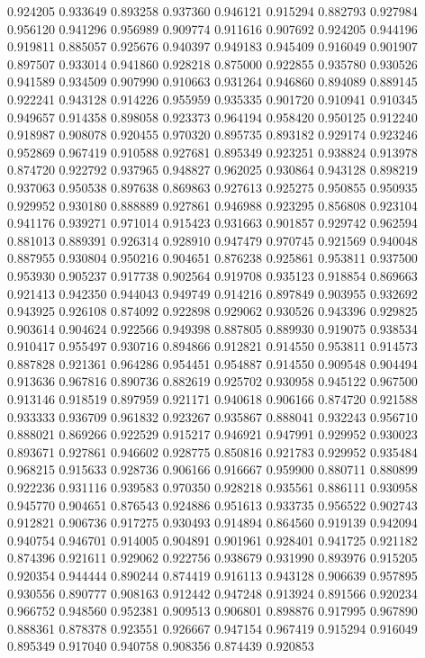 0.924205
0.933649
0.893258
0.937360
0.946121
0.915294
0.882793
0.927984
0.956120
0.941296
0.956989
0.909774
0.911616
0.907692
0.924205
0.944196
0.919811
0.885057
0.925676
0.940397
0.949183
0.945409
0.916049
0.901907
0.897507
0.933014
0.941860
0.928218
0.875000
0.922855
0.935780
0.930526
0.941589
0.934509
0.907990
0.910663
0.931264
0.946860
0.894089
0.889145
0.922241
0.943128
0.914226
0.955959
0.935335
0.901720
0.910941
0.910345
0.949657
0.914358
0.898058
0.923373
0.964194
0.958420
0.950125
0.912240
0.918987
0.908078
0.920455
0.970320
0.895735
0.893182
0.929174
0.923246
0.952869
0.967419
0.910588
0.927681
0.895349
0.923251
0.938824
0.913978
0.874720
0.922792
0.937965
0.948827
0.962025
0.930864
0.943128
0.898219
0.937063
0.950538
0.897638
0.869863
0.927613
0.925275
0.950855
0.950935
0.929952
0.930180
0.888889
0.927861
0.946988
0.923295
0.856808
0.923104
0.941176
0.939271
0.971014
0.915423
0.931663
0.901857
0.929742
0.962594
0.881013
0.889391
0.926314
0.928910
0.947479
0.970745
0.921569
0.940048
0.887955
0.930804
0.950216
0.904651
0.876238
0.925861
0.953811
0.937500
0.953930
0.905237
0.917738
0.902564
0.919708
0.935123
0.918854
0.869663
0.921413
0.942350
0.944043
0.949749
0.914216
0.897849
0.903955
0.932692
0.943925
0.926108
0.874092
0.922898
0.929062
0.930526
0.943396
0.929825
0.903614
0.904624
0.922566
0.949398
0.887805
0.889930
0.919075
0.938534
0.910417
0.955497
0.930716
0.894866
0.912821
0.914550
0.953811
0.914573
0.887828
0.921361
0.964286
0.954451
0.954887
0.914550
0.909548
0.904494
0.913636
0.967816
0.890736
0.882619
0.925702
0.930958
0.945122
0.967500
0.913146
0.918519
0.897959
0.921171
0.940618
0.906166
0.874720
0.921588
0.933333
0.936709
0.961832
0.923267
0.935867
0.888041
0.932243
0.956710
0.888021
0.869266
0.922529
0.915217
0.946921
0.947991
0.929952
0.930023
0.893671
0.927861
0.946602
0.928775
0.850816
0.921783
0.929952
0.935484
0.968215
0.915633
0.928736
0.906166
0.916667
0.959900
0.880711
0.880899
0.922236
0.931116
0.939583
0.970350
0.928218
0.935561
0.886111
0.930958
0.945770
0.904651
0.876543
0.924886
0.951613
0.933735
0.956522
0.902743
0.912821
0.906736
0.917275
0.930493
0.914894
0.864560
0.919139
0.942094
0.940754
0.946701
0.914005
0.904891
0.901961
0.928401
0.941725
0.921182
0.874396
0.921611
0.929062
0.922756
0.938679
0.931990
0.893976
0.915205
0.920354
0.944444
0.890244
0.874419
0.916113
0.943128
0.906639
0.957895
0.930556
0.890777
0.908163
0.912442
0.947248
0.913924
0.891566
0.920234
0.966752
0.948560
0.952381
0.909513
0.906801
0.898876
0.917995
0.967890
0.888361
0.878378
0.923551
0.926667
0.947154
0.967419
0.915294
0.916049
0.895349
0.917040
0.940758
0.908356
0.874439
0.920853
